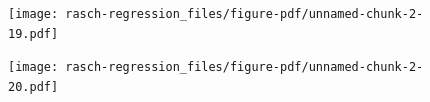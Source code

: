 \documentclass[
  letterpaper,
  DIV=11,
  numbers=noendperiod]{scrreprt}
\newenvironment{Shaded}{\begin{snugshade}}{\end{snugshade}}
\newcommand{\FunctionTok}[1]{\textcolor[rgb]{0.28,0.35,0.67}{#1}}
\newcommand{\NormalTok}[1]{\textcolor[rgb]{0.00,0.23,0.31}{#1}}
\newcommand{\OtherTok}[1]{\textcolor[rgb]{0.00,0.23,0.31}{#1}}
\newcommand{\SpecialCharTok}[1]{\textcolor[rgb]{0.37,0.37,0.37}{#1}}
\begin{document}
\begin{figure}[H]

{\centering \texttt{[image: rasch-regression\_files/figure-pdf/unnamed-chunk-2-19.pdf]}

}

\end{figure}

\begin{figure}[H]

{\centering \texttt{[image: rasch-regression\_files/figure-pdf/unnamed-chunk-2-20.pdf]}

}

\end{figure}

\begin{Shaded}
\end{Shaded}
\end{document}
